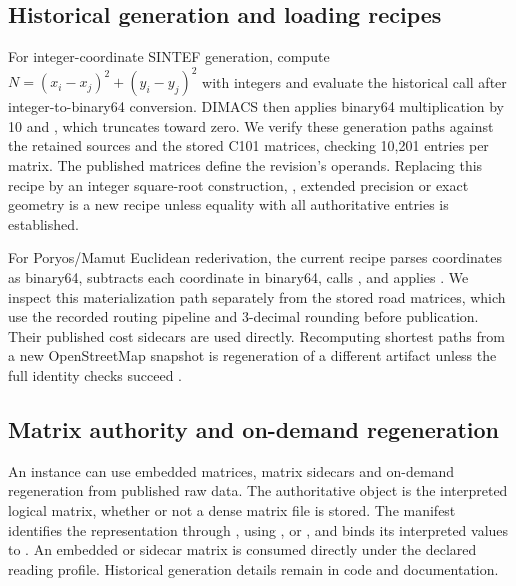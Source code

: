\subsection{Historical generation and loading recipes}
For integer-coordinate SINTEF generation, compute $N=(x_i-x_j)^2+(y_i-y_j)^2$ with integers and evaluate the historical  call after integer-to-binary64 conversion. DIMACS then applies binary64 multiplication by 10 and , which truncates toward zero. We verify these generation paths against the retained sources and the stored C101 matrices, checking 10,201 entries per matrix. The published matrices define the revision's operands. Replacing this recipe by an integer square-root construction, , extended precision or exact geometry is a new recipe unless equality with all authoritative entries is established.

For Poryos/Mamut Euclidean rederivation, the current recipe parses coordinates as binary64, subtracts each coordinate in binary64, calls , and applies . We inspect this materialization path separately from the stored road matrices, which use the recorded routing pipeline and 3-decimal rounding before publication. Their published cost sidecars are used directly. Recomputing shortest paths from a new OpenStreetMap snapshot is regeneration of a different artifact unless the full identity checks succeed \autocite{pichonPoryos2026,pichonMamut2026}.

\subsection{Matrix authority and on-demand regeneration}\label{sec:materialization}
An instance can use embedded matrices, matrix sidecars and on-demand regeneration from published raw data. The authoritative object is the interpreted logical matrix, whether or not a dense matrix file is stored. The manifest identifies the representation through , using ,  or , and binds its interpreted values to . An embedded or sidecar matrix is consumed directly under the declared reading profile. Historical generation details remain in code and documentation.


